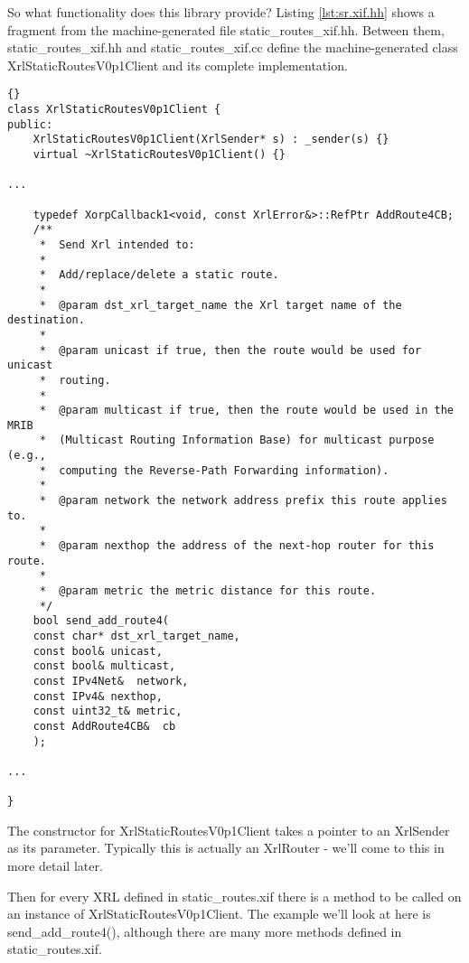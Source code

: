 \documentclass[11pt]{article}
\begin{document}
So what functionality does this library provide?  Listing
\ref{lst:sr.xif.hh} shows a fragment from the machine-generated file
{\stt static\_routes\_xif.hh}.  Between them, {\stt static\_routes\_xif.hh} and {\stt
static\_routes\_xif.cc} define the machine-generated class {\stt
XrlStaticRoutesV0p1Client} and its complete implementation.



\begin{lstlisting}[caption={ Fragment from {\stt xorp/xrl/interfaces/static\_routes\_xif.hh} %
                                     \label{lst:sr.xif.hh} } ]{}
class XrlStaticRoutesV0p1Client {
public:
    XrlStaticRoutesV0p1Client(XrlSender* s) : _sender(s) {}
    virtual ~XrlStaticRoutesV0p1Client() {}

...

    typedef XorpCallback1<void, const XrlError&>::RefPtr AddRoute4CB;
    /**
     *  Send Xrl intended to:
     *
     *  Add/replace/delete a static route.
     *
     *  @param dst_xrl_target_name the Xrl target name of the destination.
     *
     *  @param unicast if true, then the route would be used for unicast
     *  routing.
     *
     *  @param multicast if true, then the route would be used in the MRIB
     *  (Multicast Routing Information Base) for multicast purpose (e.g.,
     *  computing the Reverse-Path Forwarding information).
     *
     *  @param network the network address prefix this route applies to.
     *
     *  @param nexthop the address of the next-hop router for this route.
     *
     *  @param metric the metric distance for this route.
     */
    bool send_add_route4(
	const char*	dst_xrl_target_name,
	const bool&	unicast,
	const bool&	multicast,
	const IPv4Net&	network,
	const IPv4&	nexthop,
	const uint32_t&	metric,
	const AddRoute4CB&	cb
    );

...

}
\end{lstlisting}

\newpage

The constructor for {\stt XrlStaticRoutesV0p1Client} takes a pointer to
an {\stt XrlSender} as its parameter.  Typically this is actually an
{\stt XrlRouter} - we'll come to this in more detail later.

Then for every XRL defined in {\stt static\_routes.xif} there is a
method to be called on an instance of {\stt XrlStaticRoutesV0p1Client}.
The example we'll look at here is {\stt send\_add\_route4()}, although
there are many more methods defined in {\stt static\_routes.xif}.
\end{document}
